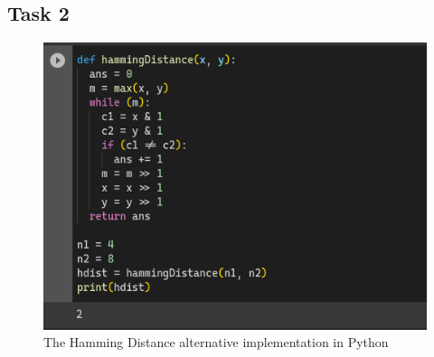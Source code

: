 \documentclass[12pt,titlepage]{article}
\begin{document}
\subsection{Task 2}
\begin{figure}[h]
    \centering
    \includegraphics[width=.6\textwidth]{./images/hamming-2.png}
    \caption{The Hamming Distance alternative implementation in Python}
\end{figure}

\pagebreak
\end{document}
